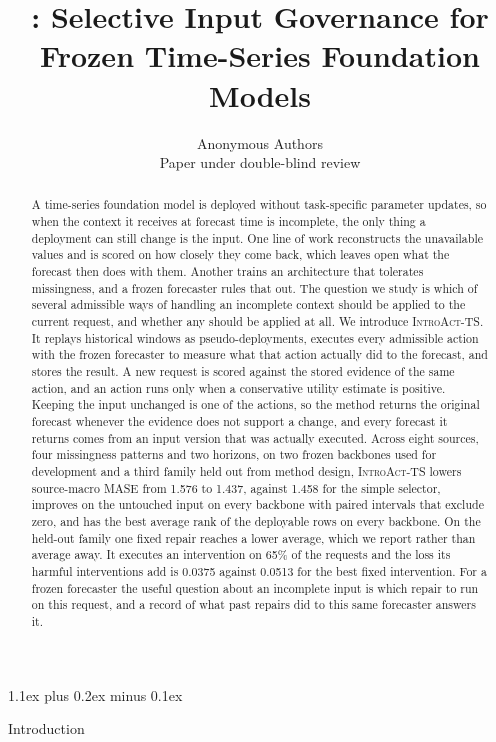 \documentclass{article}
\title{\introact{}: Selective Input Governance for \\
Frozen Time-Series Foundation Models}
\author{Anonymous Authors\\Paper under double-blind review}
\makeatletter
\newcommand{\introact}{\textsc{IntroAct-TS}}
\def\section{\@startsection{section}{1}{\z@}{-1.6ex plus -0.5ex minus -.2ex}%
  {1.1ex plus 0.2ex minus 0.1ex}{\large\sc\raggedright}}
\makeatother
\begin{document}
\maketitle

\begin{abstract}
A time-series foundation model is deployed without task-specific parameter updates, so when the
context it receives at forecast time is incomplete, the only thing a deployment can still
change is the input. One line of work reconstructs the unavailable values and is scored on how closely they come
back, which leaves open what the forecast then does with them. Another trains an architecture
that tolerates missingness, and a frozen forecaster rules that out. The question we study is which of several admissible ways of handling an incomplete
context should be applied to the current request, and whether any should be applied at all. We
introduce \introact{}. It replays historical windows as pseudo-deployments, executes every
admissible action with the frozen forecaster to measure what that action actually did to the
forecast, and stores the result. A new request is scored against the stored evidence of the
same action, and an action runs only when a conservative utility estimate is positive.
Keeping the input unchanged is one of the actions, so the method returns the original forecast
whenever the evidence does not support a change, and every forecast it returns comes from an
input version that was actually executed. Across eight sources, four missingness
patterns and two horizons, on two frozen backbones used for development and a third family
held out from method design, \introact{} lowers source-macro MASE from 1.576 to 1.437, against 1.458 for the simple selector, improves on the untouched input on every backbone with paired intervals that exclude zero, and has the best average rank of the deployable rows on every backbone. On the held-out family one fixed repair reaches a lower average, which we report rather than average away. It executes an intervention on 65\% of the requests and the loss its harmful interventions add is 0.0375 against 0.0513 for the best fixed intervention.
For a frozen forecaster the useful question about an incomplete input is which repair to run on this request, and a record of what past repairs did to this same forecaster answers it.
\end{abstract}

\section{Introduction}
\label{sec:intro}
\end{document}
